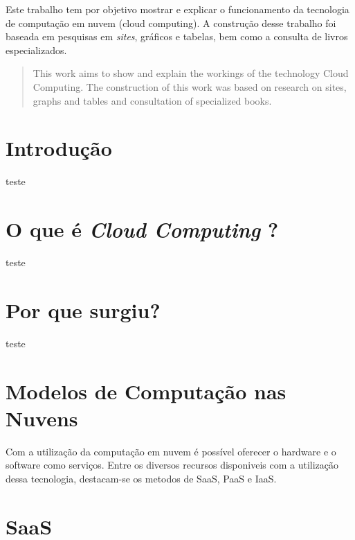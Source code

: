 \documentclass{abnt}
\begin{document}
	\capa
	
	\folhaderosto
	
	\begin{resumo}
		Este trabalho tem por objetivo mostrar e explicar o funcionamento da tecnologia de computação em nuvem (cloud computing). 
		A construção desse trabalho foi baseada em pesquisas em \textit{sites}, gráficos e tabelas, bem como a consulta de livros especializados.
	\end{resumo}

	\begin{abstract}
		This work aims to show and explain the workings of the technology Cloud Computing. The construction of this work was based on research on sites, graphs and tables and consultation of specialized books.
	\end{abstract}
	
	\sumario
	
	\listadetabelas
	
	\listadefiguras
	
	\newpage
	
	\chapter{Introdução}
		teste
	\chapter{O que é \textit{Cloud Computing} ?}
		teste
	\chapter{Por que surgiu?}
		teste
	\chapter{Modelos de Computação nas Nuvens}

	Com a utilização da computação em nuvem é possível oferecer o 
	hardware e o software como serviços. 
	Entre os diversos recursos disponiveis com a utilização dessa tecnologia, 
	destacam-se os metodos de SaaS, PaaS e IaaS.

	\chapter{SaaS}
	
\end{document}
